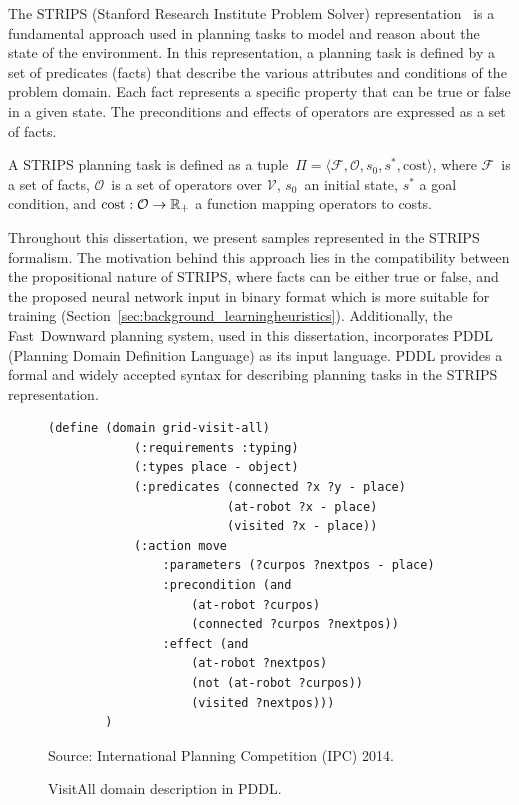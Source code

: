 The STRIPS (Stanford Research Institute Problem Solver) representation~\cite{Fikes.Nilsson/1971} is a fundamental approach used in planning tasks to model and reason about the state of the environment. In this representation, a planning task is defined by a set of predicates (facts) that describe the various attributes and conditions of the problem domain. Each fact represents a specific property that can be true or false in a given state. The preconditions and effects of operators are expressed as a set of facts.

\begin{definition}
    \label{def:stripsplanningtask}
    A STRIPS planning task is defined as a tuple~$\Pi=\langle\mathcal{F},\mathcal{O},s_0,s^*, \text{cost}\rangle$, where $\mathcal{F}$~is a set of facts, $\mathcal{O}$~is a set of operators over $\mathcal{V}$, $s_0$~an initial state, $s^*$ a goal condition, and $\text{cost}:\mathcal{O}\rightarrow\mathbb{R}_{+}$ a function mapping operators to costs.
\end{definition}

Throughout this dissertation, we present samples represented in the STRIPS formalism. The motivation behind this approach lies in the compatibility between the propositional nature of STRIPS, where facts can be either true or false, and the proposed neural network input in binary format which is more suitable for training (Section~\ref{sec:background_learningheuristics}). Additionally, the Fast~Downward planning system, used in this dissertation, incorporates PDDL (Planning Domain Definition Language) as its input language. PDDL provides a formal and widely accepted syntax for describing planning tasks in the STRIPS representation.

\begin{figure}[ht]
\caption{VisitAll domain description in PDDL.}
\label{fig:pddl}
\addvspace{\baselineskip}
\centering
\begin{lstlisting}[basicstyle=\ttfamily]
        (define (domain grid-visit-all)
            (:requirements :typing)
            (:types place - object)
            (:predicates (connected ?x ?y - place)
                         (at-robot ?x - place)
                         (visited ?x - place))
            (:action move
                :parameters (?curpos ?nextpos - place)
                :precondition (and
                    (at-robot ?curpos)
                    (connected ?curpos ?nextpos))
                :effect (and 
                    (at-robot ?nextpos)
                    (not (at-robot ?curpos))
                    (visited ?nextpos)))
        )
\end{lstlisting}
Source: International Planning Competition (IPC) 2014.
\end{figure}

